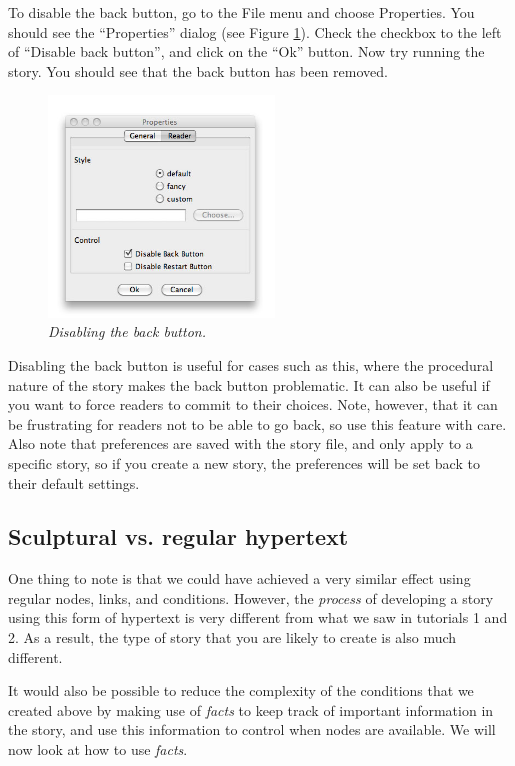 \documentclass{article}
\begin{document}
To disable the back button, go to the File menu and choose Properties. You should
see the ``Properties'' dialog (see Figure \ref{fig:tut3:preferences}). Check the
checkbox to the left of ``Disable back button'', and click on the ``Ok'' button.
Now try running the story. You should see that the back button has been removed.

\begin{figure}[h]
  \centering
  \includegraphics[width=6cm]{images/hypedyn-tutorial-3-figure-8}
  \caption{\textit{Disabling the back button.}}
  \label{fig:tut3:preferences}
\end{figure} 

Disabling the back button is useful for cases such as this, where the procedural
nature of the story makes the back button problematic. It can also be useful if
you want to force readers to commit to their choices. Note, however, that it can
be frustrating for readers not to be able to go back, so use this feature with
care. Also note that preferences are saved with the story file, and only apply to
a specific story, so if you create a new story, the preferences will be set back
to their default settings.

\subsection{Sculptural vs. regular hypertext}

One thing to note is that we could have achieved a very similar effect using
regular nodes, links, and conditions. However, the \textit{process} of
developing a story using this form of hypertext is very different from what we
saw in tutorials 1 and 2. As a result, the type of story that you are likely to
create is also much different.

It would also be possible to reduce the complexity of the conditions that we
created above by making use of \textit{facts} to keep track of important
information in the story, and use this information to control when nodes are
available. We will now look at how to use \textit{facts}.
\end{document}
